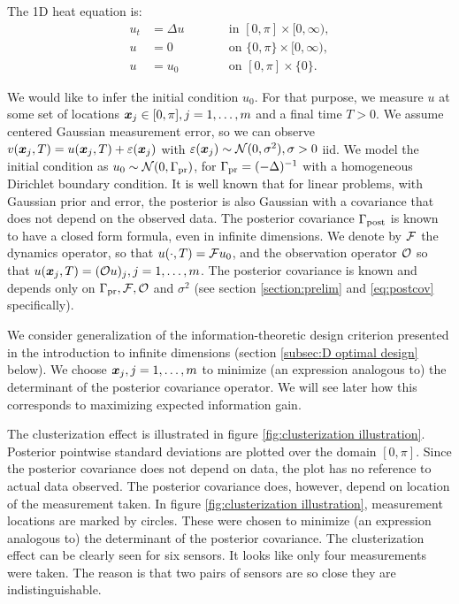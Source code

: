 \documentclass{amsart}
\numberwithin{equation}{section}
\begin{document}
The 1D heat equation is:
\begin{subequations}\label{eq:heat equation}
  \begin{alignat}{2}
    u_t &= \Delta u &&\qquad \text{in } [0,\pi] \times [0,\infty),\\
      u &= 0 &&\qquad \text{on } \{0, \pi\} \times [0,\infty),\\
        u &= u_0 &&\qquad \text{on }[0,\pi] \times \{0\}.
  \end{alignat}
\end{subequations}

We would like to infer the initial condition $u_0$. For that purpose,
we measure $u$ at some set of locations ${\boldsymbol{x}}_j \in [0,\pi], j=1,
\dots,m$ and a final time $T > 0$. We assume centered Gaussian
measurement error, so we can observe $v({\boldsymbol{x}}_j,T) = u({\boldsymbol{x}}_j,T) +
\varepsilon({\boldsymbol{x}}_j)$ with $\varepsilon({\boldsymbol{x}}_j) \sim \mathcal{N}(0, \sigma^2), \sigma > 0$
iid. We model the initial condition as $u_0 \sim \mathcal{N}(0,\Gamma_{\textup{pr}})$,
for $\Gamma_{\textup{pr}} = (-\Delta)^{-1}$ with a homogeneous Dirichlet boundary
condition. It is well known \cite{Tarantola05} that for linear
problems, with Gaussian prior and error, the posterior is also
Gaussian with a covariance that does not depend on the observed
data. The posterior covariance $\Gamma_{\textup{post}}$ is known to have a closed
form formula, even in infinite dimensions\cite{Stuart10}. We denote by
$\mathcal{F}$ the dynamics operator, so that $u( \cdot,T) = \mathcal{F} u_0$, and
the observation operator $\mathcal{O}$ so that $u({\boldsymbol{x}}_j,T) = (\mathcal{O} u)_j,
j=1,\dots,m$. The posterior covariance is known and depends only on
$\Gamma_{\textup{pr}}, \mathcal{F}, \mathcal{O}$ and $\sigma^2$ (see section \ref{section:prelim}
and \eqref{eq:postcov} specifically).

We consider generalization of the information-theoretic design
criterion presented in the introduction to infinite dimensions
(section \ref{subsec:D optimal design} below). We choose
${\boldsymbol{x}}_j,j=1,\dots,m$ to minimize (an expression analogous to) the
determinant of the posterior covariance operator. We will see later
how this corresponds to maximizing expected information gain.


The clusterization effect is illustrated in figure
\ref{fig:clusterization illustration}. Posterior pointwise standard
deviations are plotted over the domain $[0, \pi]$. Since the posterior
covariance does not depend on data, the plot has no reference to
actual data observed. The posterior covariance does, however, depend
on location of the measurement taken. In figure
\ref{fig:clusterization illustration}, measurement locations are
marked by circles. These were chosen to minimize (an expression
analogous to) the determinant of the posterior covariance. The
clusterization effect can be clearly seen for six sensors. It looks
like only four measurements were taken. The reason is that two pairs
of sensors are so close they are indistinguishable.
\end{document}

